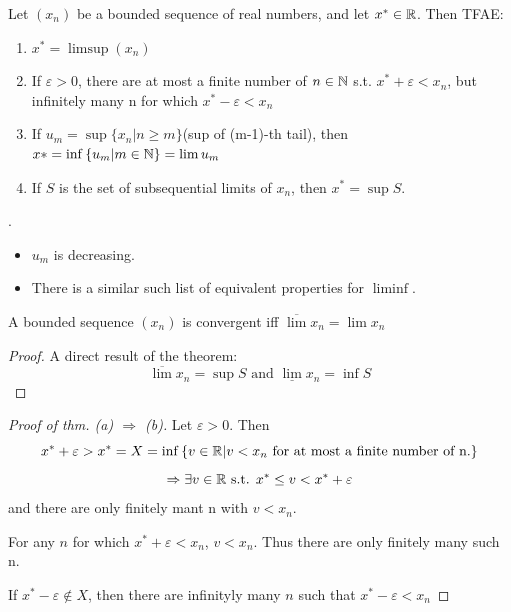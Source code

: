 \documentclass[a4paper,12pt]{article}
\begin{document}
\begin{theorem}
    Let \((x_n)\) be a bounded sequence of real numbers, and let \(x^*\in\mathbb{R}\). Then TFAE:
    \begin{enumerate}
        \item \(x^* = \limsup(x_n)\)
        \item If \(\varepsilon>0\), there are at most a finite number of \(n\in\mathbb{N}\) s.t.
        \(x^*+\varepsilon <x_n\), but infinitely many n for which \(x^* - \varepsilon<x_n\)
        \item If \(u_m=\sup{\{x_n|n\ge m\}}\)(sup of (m-1)-th tail), then \(x*=\inf{\{u_m|m\in\mathbb{N}\}} = \lim{u_m}\)
        \item If \(S\) is the set of subsequential limits of \(x_n\), then \(x^*=\sup S\).\\
    \end{enumerate}

    \begin{remark}
        .
        \begin{itemize}
            \item \(u_m\) is decreasing.
            \item There is a similar such list of equivalent properties for \(\liminf\).\\
        \end{itemize}
    \end{remark}

    \begin{corollary}
        A bounded sequence \((x_n)\) is convergent iff \(\overline{\lim}x_n = \lim x_n\)
        \begin{proof}
            A direct result of the theorem:\[\overline{\lim}x_n=\sup{S} \text{ and } \underline{\lim}x_n=\inf{S}\]
        \end{proof}
    \end{corollary}

    \begin{proof}[Proof of thm. (a) \(\Rightarrow\) (b)]
        Let \(\varepsilon >0\). Then
        \[x^*+\varepsilon>x^* = X =\inf{\{v\in\mathbb{R}| v<x_n \text{ for at most a finite number of n.}\}}\]
        \[\Rightarrow \exists v\in\mathbb{R} \text{ s.t. } x^*\le v < x^*+\varepsilon\]
        and there are only finitely mant n with \(v<x_n\).
        
        For any \(n\) for which \(x^*+\varepsilon < x_n\), \(v<x_n\). Thus there are only finitely many such n.

        If \(x^*-\varepsilon \notin X\), then there are infinityly many \(n\) such that \(x^* - \varepsilon<x_n\)
    \end{proof}
    \newpage


\end{theorem}
\end{document}
